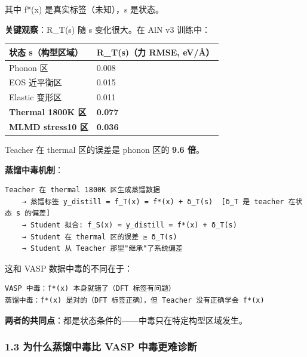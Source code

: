 \documentclass[
  12pt,
]{ctexart}
\begin{document}
其中 f*(x) 是真实标签（未知），s 是状态。

\textbf{关键观察}：R\_T(s) 随 s 变化很大。在 AlN v3 训练中：

\begin{longtable}[]{@{}ll@{}}
\toprule\noalign{}
状态 s（构型区域） & R\_T(s)（力 RMSE, eV/Å） \\
\midrule\noalign{}
\endhead
\bottomrule\noalign{}
\endlastfoot
Phonon 区 & 0.008 \\
EOS 近平衡区 & 0.015 \\
Elastic 变形区 & 0.011 \\
\textbf{Thermal 1800K 区} & \textbf{0.077} \\
\textbf{MLMD stress10 区} & \textbf{0.036} \\
\end{longtable}

Teacher 在 thermal 区的误差是 phonon 区的 \textbf{9.6 倍}。

\textbf{蒸馏中毒机制}：

\begin{verbatim}
Teacher 在 thermal 1800K 区生成蒸馏数据
    → 蒸馏标签 y_distill = f_T(x) = f*(x) + δ_T(s)  [δ_T 是 teacher 在状态 s 的偏差]
    → Student 拟合: f_S(x) ≈ y_distill = f*(x) + δ_T(s)
    → Student 在 thermal 区的误差 ≥ δ_T(s)
    → Student 从 Teacher 那里"继承"了系统偏差
\end{verbatim}

这和 VASP 数据中毒的不同在于：

\begin{verbatim}
VASP 中毒：f*(x) 本身就错了（DFT 标签有问题）
蒸馏中毒：f*(x) 是对的（DFT 标签正确），但 Teacher 没有正确学会 f*(x)
\end{verbatim}

\textbf{两者的共同点}：都是状态条件的------中毒只在特定构型区域发生。

\subsubsection{1.3 为什么蒸馏中毒比 VASP
中毒更难诊断}\label{ux4e3aux4ec0ux4e48ux84b8ux998fux4e2dux6bd2ux6bd4-vasp-ux4e2dux6bd2ux66f4ux96beux8bcaux65ad}
\end{document}
